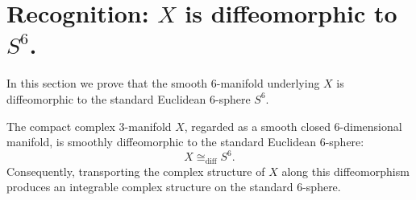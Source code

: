 \section{Recognition: $X$ is diffeomorphic to $S^6$.}

In this section we prove that the smooth $6$-manifold underlying $X$ is diffeomorphic to the standard Euclidean $6$-sphere $S^6$.

\begin{theorem}\label{thm:recognition-S6-full}
The compact complex $3$-manifold $X$, regarded as a smooth closed $6$-dimensional manifold, is smoothly diffeomorphic to the standard Euclidean $6$-sphere:
\[
X \cong_{\mathrm{diff}} S^6.
\]
Consequently, transporting the complex structure of $X$ along this diffeomorphism produces an integrable complex structure on the standard $6$-sphere.
\end{theorem}

